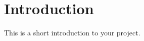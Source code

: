 \documentclass[12pt,twoside]{article}
\begin{document}


\section{Introduction}
This is a short introduction to your project.



\end{document}
